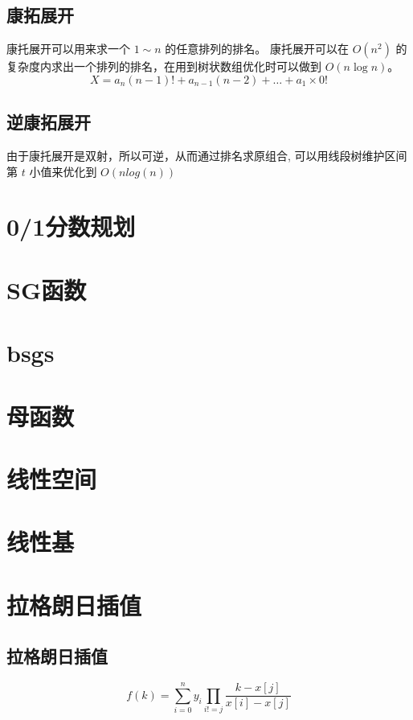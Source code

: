 \documentclass{probook}
\begin{document}
\subsection{康拓展开} 
康托展开可以用来求一个 $1\sim n$ 的任意排列的排名。
康托展开可以在 $O(n^2)$ 的复杂度内求出一个排列的排名，在用到树状数组优化时可以做到 $O(n\log n)$。
$$
X = a_n(n - 1)! + a_{n - 1}(n - 2) + \dots + a_1\times 0! 
$$
 
\subsection{逆康拓展开} 
由于康托展开是双射，所以可逆，从而通过排名求原组合, 可以用线段树维护区间第 $t$ 小值来优化到 $O(nlog(n))$
 
\section{0/1分数规划} 

\section{SG函数} 
 
\section{bsgs} 

\section{母函数} 
 
\section{线性空间} 

\section{线性基} 

\section{拉格朗日插值}
\subsection{拉格朗日插值}
$$
f(k) = \sum_{i = 0}^{n}y_i\prod_{i != j}^{}\frac{k - x[j]}{x[i] - x[j]}
$$

\end{document}

